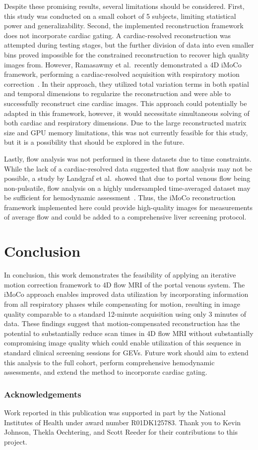 Despite these promising results, several limitations should be considered. First, this study was conducted on a small cohort of 5 subjects, limiting statistical power and generalizability. Second, the implemented reconstruction framework does not incorporate cardiac gating. A cardiac-resolved reconstruction was attempted during testing stages, but the further division of data into even smaller bins proved impossible for the constrained reconstruction to recover high quality images from. However, Ramasawmy et al.\ recently demonstrated a 4D iMoCo framework, performing a cardiac-resolved acquisition with respiratory motion correction~\cite{ramasawmyIsotropic3DCardiac2026}. In their approach, they utilized total variation terms in both spatial and temporal dimensions to regularize the reconstruction and were able to successfully reconstruct cine cardiac images. This approach could potentially be adapted in this framework, however, it would necessitate simultaneous solving of both cardiac and respiratory dimensions. Due to the large reconstructed matrix size and GPU memory limitations, this was not currently feasible for this study, but it is a possibility that should be explored in the future. 

Lastly, flow analysis was not performed in these datasets due to time constraints. While the lack of a cardiac-resolved data suggested that flow analysis may not be possible, a study by Landgraf et al.\ showed that due to portal venous flow being non-pulsatile, flow analysis on a highly undersampled time-averaged dataset may be sufficient for hemodynamic assessment~\cite{landgrafEffectTemporalResolution2014}. Thus, the iMoCo reconstruction framework implemented here could provide high-quality images for measurements of average flow and could be added to a comprehensive liver screening protocol. 

\section{Conclusion}\label{sec:imoco_conclusion}
In conclusion, this work demonstrates the feasibility of applying an iterative motion correction framework to 4D flow MRI of the portal venous system. The iMoCo approach enables improved data utilization by incorporating information from all respiratory phases while compensating for motion, resulting in image quality comparable to a standard 12-minute acquisition using only 3 minutes of data. These findings suggest that motion-compensated reconstruction has the potential to substantially reduce scan times in 4D flow MRI without substantially compromising image quality which could enable utilization of this sequence in standard clinical screening sessions for GEVs. Future work should aim to extend this analysis to the full cohort, perform comprehensive hemodynamic assessments, and extend the method to incorporate cardiac gating.

\subsubsection{Acknowledgements}
Work reported in this publication was supported in part by the National Institutes of Health under award number R01DK125783. Thank you to Kevin Johnson, Thekla Oechtering, and Scott Reeder for their contributions to this project.